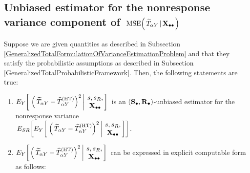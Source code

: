 \vskip 1.0cm
\subsection{Unbiased estimator for the nonresponse variance component of
\,$\textnormal{MSE}\!\left(\,\widetilde{T}_{\alpha Y}\left\vert\,\mathbf{X}_{\bullet\bullet}\right.\right)$}
\setcounter{theorem}{0}


\vskip 0.1cm
\begin{lemma}
\label{GeneralizedTotalNonresponseVariance}
\mbox{}
\vskip 0.1cm
\noindent
Suppose we are given quantities as described in Subsection
\ref{GeneralizedTotalFormulationOfVarianceEstimationProblem}
and
that they satisfy the probabilistic assumptions as described in Subsection
\ref{GeneralizedTotalProbabilisticFramework}.
\vskip 0.1cm
\noindent
Then, the following statements are true:
\renewcommand{\theenumi}{\roman{enumi}}
\renewcommand{\labelenumi}{\mbox{}\;\;\,(\theenumi)$\quad$}
\begin{enumerate}
\item
    $
    E_{Y}\!\left[\,
        \left.
        \left(\,\widetilde{T}_{\alpha Y} - \widehat{T}^{\textnormal{(HT)}}_{\alpha Y}\right)^{2}
        \,\right\vert\!\!
        \begin{array}{c} s,s_{R}, \\ \mathbf{X}_{\bullet\bullet} \end{array}
        \!\!\right]
    $\,
    is an $(\mathbf{S}_{\bullet},\mathbf{R}_{\bullet})$-unbiased estimator for the nonresponse variance\\
    \,$
    E_{SR}\!\left[
    E_{Y}\!\left[\,
        \left.
        \left(\,\widetilde{T}_{\alpha Y} - \widehat{T}^{\textnormal{(HT)}}_{\alpha Y}\right)^{2}
        \,\right\vert\!\!
        \begin{array}{c} s,s_{R}, \\ \mathbf{X}_{\bullet\bullet} \end{array}
        \!\!\right]
        \right]
    $.
\item
    $
    E_{Y}\!\left[
        \left.
        \left(\,\widetilde{T}_{\alpha Y} - \widehat{T}^{\textnormal{(HT)}}_{\alpha Y}\right)^{2}
        \,\right\vert\!\!
        \begin{array}{c} s,s_{R}, \\ \mathbf{X}_{\bullet\bullet} \end{array}
        \!\!\right]
    $\,
    can be expressed in explicit computable form as follows:
    \begin{eqnarray*}

\end{eqnarray*}
\end{enumerate}
\end{lemma}
